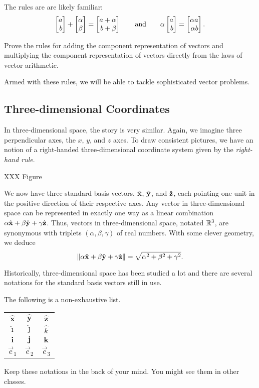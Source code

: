 The rules are are likely familiar:
\[
	\mat{a\\b}+\mat{\alpha\\\beta} = \mat{a+\alpha\\b+\beta}
	\qquad\text{and}\qquad
	\alpha \mat{a\\b}=\mat{\alpha a\\\alpha b}.
\]

\begin{exercise}
	Prove the rules for adding the component representation
	of vectors and multiplying the component representation 
	of vectors directly from the laws of vector arithmetic.
\end{exercise}

Armed with these rules, we will be able to tackle sophisticated vector
problems.

\subsection{Three-dimensional Coordinates}
In three-dimensional space, the story is very similar.  Again, we imagine
three perpendicular axes, the $x$, $y$, and $z$ axes.  
To draw consistent
pictures, we have an notion of a right-handed three-dimensional coordinate
system given by the \emph{right-hand rule}.

XXX Figure

We now have three standard basis vectors, ${\hat {\mathbf x}}$, ${\hat {\mathbf y}}$,
and ${\hat {\mathbf z}}$, each pointing one unit in the positive direction of their
respective axes.
Any vector in three-dimensional
space can be represented 
in exactly one way
as a linear combination $\alpha{\hat {\mathbf x}}+\beta{\hat {\mathbf y}}+\gamma{\hat {\mathbf z}}$.  Thus,
vectors in three-dimensional space, notated $\mathbb{R}^3$,
are synonymous with triplets $(\alpha,\beta,\gamma)$
of real numbers.  With some clever geometry, we deduce
\[
	\lVert\alpha{\hat {\mathbf x}}+\beta{\hat {\mathbf y}}+\gamma{\hat {\mathbf z}}\rVert=\sqrt{\alpha^2+\beta^2+\gamma^2}.
\]

Historically, three-dimensional space has been studied a lot and there
are several notations for the standard basis vectors still in use.

The following is a non-exhaustive list.
\begin{center}
	\begin{tabular}{c  c  c}
		$\hat{\mathbf{x}}$ & $\hat{\mathbf{y}}$ &$\hat{\mathbf{z}}$\\
		$\hat{\imath}$ & $\hat{\jmath}$ &$\hat{k}$\\
		$\mathbf{i}$ & $\mathbf j$ & $\mathbf k$\\
		$\vec e_1$ & $\vec e_2$ & $\vec e_3$
	\end{tabular}
\end{center}
Keep these notations in the back of your mind.  You might see them in other classes.


